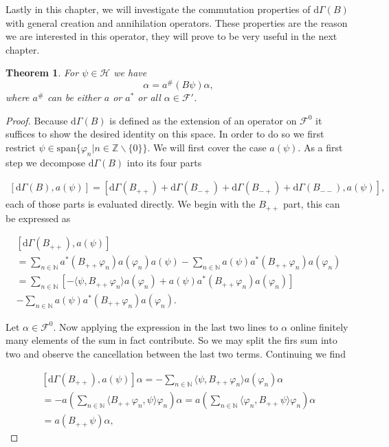 \documentclass[b5paper,draft,openbib,12pt]{memoir}
\newtheorem{Thm}[Def]{Theorem}
\begin{document}
Lastly in this chapter, we will investigate the commutation properties of \(\mathrm{d}\Gamma(B)\) with general creation and annihilation operators.
These properties are the reason we are interested in this operator, they will prove to be very useful in the next chapter.

\begin{Thm}\label{Commutation Gamma}
For \(\psi \in \mathcal{H}\) we have
\begin{equation}
[\mathrm{d}\Gamma(B),a^\# (\psi)]\alpha=a^\#(B\psi)\alpha,
\end{equation}
where \(a^\#\) can be either \(a\) or \(a^*\) 
or all \(\alpha\in\mathcal{F}'\).
\end{Thm}
\begin{proof}
Because \(\mathrm{d}\Gamma(B)\) is defined as the extension of an operator on \(\mathcal{F}^0\) it suffices to show the desired identity on this space. In order to do so
we first restrict \(\psi\in \text{span}\{\varphi_{n}| n \in \mathbb{Z}\backslash\{0\}\}\). We will first cover the case \(a(\psi)\).  
As a first step we decompose \(\mathrm{d}\Gamma(B)\) into its four parts

\begin{align}
\left[ \mathrm{d}\Gamma(B),a(\psi) \right] = \left[ \mathrm{d}\Gamma(B_{++})
+\mathrm{d}\Gamma(B_{-+})+\mathrm{d}\Gamma(B_{-+})+\mathrm{d}\Gamma(B_{--}),a(\psi) \right],
\end{align}
each of those parts is evaluated directly. We begin with the \(B_{++}\) part, this can be expressed as

\begin{align}
\left[ \mathrm{d}\Gamma(B_{++}),a(\psi) \right] \\
= \sum_{n\in\mathbb{N}} a^*(B_{++}\varphi_n)a(\varphi_n) a(\psi) - \sum_{n\in\mathbb{N}} a(\psi) a^*(B_{++}\varphi_n)a(\varphi_n) \\
=\sum_{n\in\mathbb{N}} \left[ -\langle \psi, B_{++} \varphi_n\rangle a(\varphi_n) +a(\psi) a^*(B_{++}\varphi_n)a(\varphi_n) \right]  \\
- \sum_{n\in\mathbb{N}} a(\psi) a^*(B_{++}\varphi_n)a(\varphi_n).
\end{align}

Let \(\alpha \in \mathcal{F}^0\). Now applying the expression in the last two lines to \(\alpha\) online finitely many elements of the sum in fact contribute.
So we may split the firs sum into two and observe the cancellation between the last two terms. Continuing we find

\begin{align}
\left[ \mathrm{d}\Gamma(B_{++}),a(\psi) \right] \alpha
=-\sum_{n\in\mathbb{N}}  \langle \psi, B_{++} \varphi_n\rangle a(\varphi_n)\alpha\\
=-a\left(\sum_{n\in\mathbb{N}} \langle B_{++}\varphi_n, \psi\rangle  \varphi_n  \right)\alpha
=a\left(\sum_{n\in\mathbb{N}} \langle \varphi_n, B_{++}\psi\rangle  \varphi_n  \right)\alpha\\
=a(B_{++}\psi)\alpha,
\end{align}


\end{proof}
\end{document}
